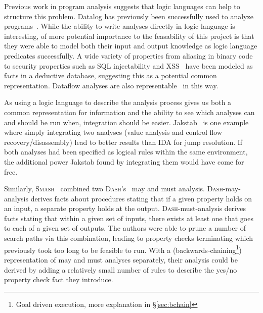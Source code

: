 Previous work in program analysis suggests that logic languages can help to structure this problem.
Datalog has previously been successfully used to analyze programs~\cite{Lam2005a, Brumley2006b, Alpuente2011, Smaragdakis, Whaley2007}.
While the ability to write analyses directly in logic language is interesting, of more potential importance to the feasability of this project is that they were able to model both their input and output knowledge as logic language predicates successfully.
A wide variety of properties from aliasing in binary code~\cite{Brumley2006b} to security properties such as SQL injectability and XSS~\cite{Lam2005a} have been modeled as facts in a deductive database, suggesting this as a potential common representation.
Dataflow analyses are also representable~\cite{McAllester} in this way.

As using a logic language to describe the analysis process gives us both a common representation for information and the ability to see which analyses can and should be run when, integration should be easier.
Jakstab~\cite{jakstab} is one example where simply integrating two analyses (value analysis and control flow recovery/disassembly) lead to better results than IDA for jump resolution.
If both analyses had been specified as logical rules within the same environment, the additional power Jakstab found by integrating them would have come for free.

Similarly, \textsc{Smash}~\cite{maymust} combined two \textsc{Dash}'s~\cite{dash} may and must analysis.
\textsc{Dash}-may-analysis derives facts about procedures stating that if a given property holds on an input, a separate property holds at the output.
\textsc{Dash}-must-analysis derives facts stating that within a given set of inputs, there exists at least one that goes to each of a given set of outputs.
The authors were able to prune a number of search paths via this combination, leading to property checks terminating which previously took too long to be feasible to run.
With a (backwards-chaining\footnote{Goal driven execution, more explanation in \S\ref{sec:bchain}}) representation of may and must analyses separately, their analysis could be derived by adding a relatively small number of rules to describe the yes/no property check fact they introduce.

